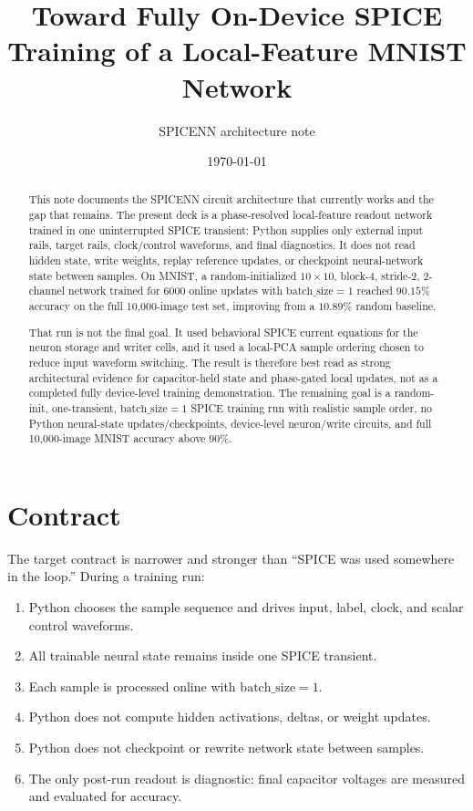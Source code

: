 \documentclass[11pt]{article}
\title{Toward Fully On-Device SPICE Training of a Local-Feature MNIST Network}
\author{SPICENN architecture note}
\date{\today}
\begin{document}
\maketitle

\begin{abstract}
This note documents the SPICENN circuit architecture that currently works and
the gap that remains.  The present deck is a phase-resolved local-feature
readout network trained in one uninterrupted SPICE transient: Python supplies
only external input rails, target rails, clock/control waveforms, and final
diagnostics.  It does not read hidden state, write weights, replay reference
updates, or checkpoint neural-network state between samples.  On MNIST, a
random-initialized \(10\times 10\), block-4, stride-2, 2-channel network trained
for 6000 online updates with \(\mathrm{batch\_size}=1\) reached \(90.15\%\)
accuracy on the full 10,000-image test set, improving from a \(10.89\%\)
random baseline.

That run is not the final goal.  It used behavioral SPICE current equations for
the neuron storage and writer cells, and it used a local-PCA sample ordering
chosen to reduce input waveform switching.  The result is therefore best read
as strong architectural evidence for capacitor-held state and phase-gated
local updates, not as a completed fully device-level training demonstration.
The remaining goal is a random-init, one-transient, \(\mathrm{batch\_size}=1\)
SPICE training run with realistic sample order, no Python neural-state
updates/checkpoints, device-level neuron/write circuits, and full 10,000-image
MNIST accuracy above \(90\%\).
\end{abstract}

\section{Contract}

The target contract is narrower and stronger than ``SPICE was used somewhere
in the loop.''  During a training run:
\begin{enumerate}
  \item Python chooses the sample sequence and drives input, label, clock, and
    scalar control waveforms.
  \item All trainable neural state remains inside one SPICE transient.
  \item Each sample is processed online with \(\mathrm{batch\_size}=1\).
  \item Python does not compute hidden activations, deltas, or weight updates.
  \item Python does not checkpoint or rewrite network state between samples.
  \item The only post-run readout is diagnostic: final capacitor voltages are
    measured and evaluated for accuracy.
\end{enumerate}
\end{document}
